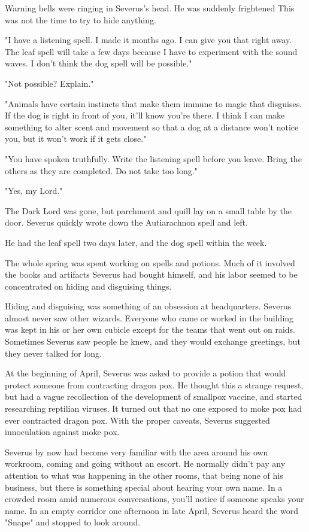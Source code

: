 Warning bells were ringing in Severus's head. He was suddenly frightened This was not the time to try to hide anything.

"I have a listening spell. I made it months ago. I can give you that right away. The leaf spell will take a few days because I have to experiment with the sound waves. I don't think the dog spell will be possible."

"Not possible? Explain."

"Animals have certain instincts that make them immune to magic that disguises. If the dog is right in front of you, it'll know you're there. I think I can make something to alter scent and movement so that a dog at a distance won't notice you, but it won't work if it gets close."

"You have spoken truthfully. Write the listening spell before you leave. Bring the others as they are completed. Do not take too long."

"Yes, my Lord."

The Dark Lord was gone, but parchment and quill lay on a small table by the door. Severus quickly wrote down the Autiarachnon spell and left.

He had the leaf spell two days later, and the dog spell within the week.

The whole spring was spent working on spells and potions. Much of it involved the books and artifacts Severus had bought himself, and his labor seemed to be concentrated on hiding and disguising things.

Hiding and disguising was something of an obsession at headquarters. Severus almost never saw other wizards. Everyone who came or worked in the building was kept in his or her own cubicle except for the teams that went out on raids. Sometimes Severus saw people he knew, and they would exchange greetings, but they never talked for long.

At the beginning of April, Severus was asked to provide a potion that would protect someone from contracting dragon pox. He thought this a strange request, but had a vague recollection of the development of smallpox vaccine, and started researching reptilian viruses. It turned out that no one exposed to moke pox had ever contracted dragon pox. With the proper caveats, Severus suggested innoculation against moke pox.

Severus by now had become very familiar with the area around his own workroom, coming and going without an escort. He normally didn't pay any attention to what was happening in the other rooms, that being none of his business, but there is something special about hearing your own name. In a crowded room amid numerous conversations, you'll notice if someone speaks your name. In an empty corridor one afternoon in late April, Severus heard the word "Snape" and stopped to look around.

